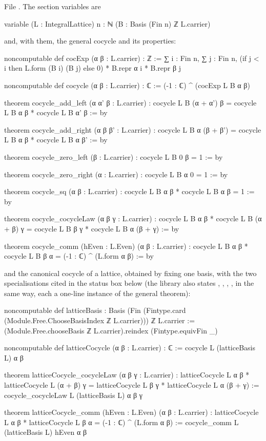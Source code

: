 File . The section variables are
\begin{leancode}
variable (L : IntegralLattice) {n : ℕ} (B : Basis (Fin n) ℤ L.carrier)
\end{leancode}
and, with them, the general cocycle and its properties:
\begin{leancode}
noncomputable def cocExp (α β : L.carrier) : ℤ :=
  ∑ i : Fin n, ∑ j : Fin n,
    (if j < i then L.form (B i) (B j) else 0) * B.repr α i * B.repr β j

noncomputable def cocycle (α β : L.carrier) : ℂ := (-1 : ℂ) ^ (cocExp L B α β)

theorem cocycle_add_left (α α' β : L.carrier) :
    cocycle L B (α + α') β = cocycle L B α β * cocycle L B α' β := by

theorem cocycle_add_right (α β β' : L.carrier) :
    cocycle L B α (β + β') = cocycle L B α β * cocycle L B α β' := by

theorem cocycle_zero_left (β : L.carrier) : cocycle L B 0 β = 1 := by

theorem cocycle_zero_right (α : L.carrier) : cocycle L B α 0 = 1 := by

theorem cocycle_sq (α β : L.carrier) : cocycle L B α β * cocycle L B α β = 1 := by

theorem cocycle_cocycleLaw (α β γ : L.carrier) :
    cocycle L B α β * cocycle L B (α + β) γ = cocycle L B β γ * cocycle L B α (β + γ) := by

theorem cocycle_comm (hEven : L.Even) (α β : L.carrier) :
    cocycle L B α β * cocycle L B β α = (-1 : ℂ) ^ (L.form α β) := by
\end{leancode}
and the canonical cocycle of a lattice, obtained by fixing one basis, with the two specialisations cited
in the status box below (the library also states , ,
, ,  in the same way, each a one-line instance of the general
theorem):
\begin{leancode}
noncomputable def latticeBasis :
    Basis (Fin (Fintype.card (Module.Free.ChooseBasisIndex ℤ L.carrier))) ℤ L.carrier :=
  (Module.Free.chooseBasis ℤ L.carrier).reindex (Fintype.equivFin _)

noncomputable def latticeCocycle (α β : L.carrier) : ℂ := cocycle L (latticeBasis L) α β

theorem latticeCocycle_cocycleLaw (α β γ : L.carrier) :
    latticeCocycle L α β * latticeCocycle L (α + β) γ
      = latticeCocycle L β γ * latticeCocycle L α (β + γ) :=
  cocycle_cocycleLaw L (latticeBasis L) α β γ

theorem latticeCocycle_comm (hEven : L.Even) (α β : L.carrier) :
    latticeCocycle L α β * latticeCocycle L β α = (-1 : ℂ) ^ (L.form α β) :=
  cocycle_comm L (latticeBasis L) hEven α β
\end{leancode}

